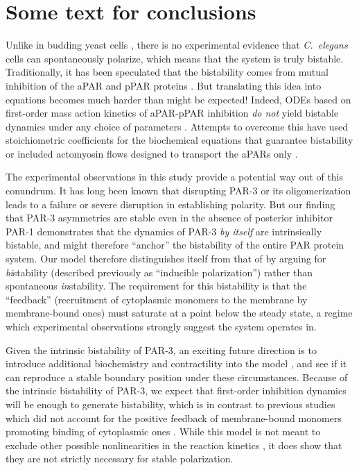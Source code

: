\documentclass[11pt]{article}
\newcommand{\6}[1]{#1_{\text{6}}}
\newcommand{\3}[1]{#1_{\text{3}}}
\begin{document}
\section{Some text for conclusions}
Unlike in budding yeast cells \cite{mogilner2012cell}, there is no experimental evidence that \emph{C.\ elegans} cells can spontaneously polarize, which means that the system is truly bistable. Traditionally, it has been speculated that the bistability comes from mutual inhibition of the aPAR and pPAR proteins \cite{halatek2018self, trong2014parameter}. But translating this idea into equations becomes much harder than might be expected! Indeed, ODEs based on first-order mass action kinetics of aPAR-pPAR inhibition \emph{do not} yield bistable dynamics under any choice of parameters \cite{dawes20113}. Attempts to overcome this have used stoichiometric coefficients for the biochemical equations that guarantee bistability \cite{goehring2011polarization, gross2019guiding} or included actomyosin flows designed to transport the aPARs only \cite{TH2008}.

The experimental observations in this study provide a potential way out of this conundrum. It has long been known that disrupting PAR-3 \cite{etemad1995asymmetrically} or its oligomerization \cite{dickinson2017single} leads to a failure or severe disruption in establishing polarity. But our finding that PAR-3 asymmetries are stable even in the absence of posterior inhibitor PAR-1 \cite{sailer2015dynamic} demonstrates that the dynamics of PAR-3 \emph{by itself} are intrinsically bistable, and might therefore ``anchor'' the bistability of the entire PAR protein system. Our model therefore distinguishes itself from that of \cite{lang2022oligomerization} by arguing for \emph{bi}stability (described previously as ``inducible polarization'') rather than spontaneous \emph{in}stability. The requirement for this bistability is that the ``feedback'' (recruitment of cytoplasmic monomers to the membrane by membrane-bound ones) must saturate at a point below the steady state, a regime which experimental observations strongly suggest the system operates in.

Given the intrinsic bistability of PAR-3, an exciting future direction is to introduce additional biochemistry and contractility into the model \cite{sailer2015dynamic}, and see if it can reproduce a stable boundary position under these circumstances. Because of the intrinsic bistability of PAR-3, we expect that first-order inhibition dynamics will be enough to generate bistability, which is in contrast to previous studies which did not account for the positive feedback of membrane-bound monomers promoting binding of cytoplasmic ones \cite{dawes20113}. While this model is not meant to exclude other possible nonlinearities in the reaction kinetics \cite{bland2023optimized}, it does show that they are not strictly necessary for stable polarization.





\end{document}
